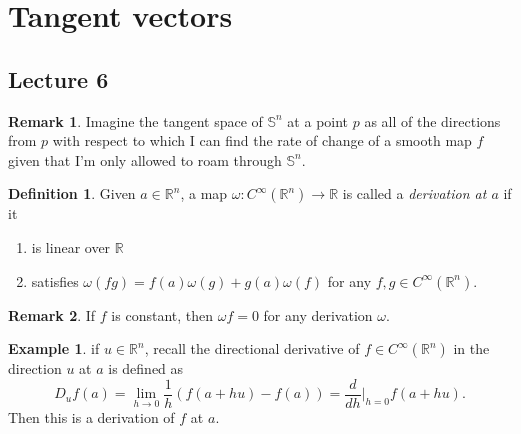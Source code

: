 \documentclass[10pt,letterpaper,cm]{nupset}
\theoremstyle{definition}
\newtheorem*{definition}{Definition}
\newtheorem{exmp}{Example}
\newtheorem{remark}{Remark}
\newcommand{\R}{\mathbb R}
\renewcommand{\S}{\mathbb S}
\newcommand{\1}{\mathbf{1}}
\newcommand{\0}{\vec 0}
\begin{document}
\section{Tangent vectors}

\subsection{Lecture 6}

\begin{remark}
Imagine the tangent space of $\S^n$ at a point $p$ as all of the directions from $p$ with respect to which I can find the rate of change of a smooth map $f$ given that I'm only allowed to roam through $\S^n$. 
\end{remark}


\begin{definition}
Given $a \in \R^n$, a map $\omega: C^{\infty}(\R^n) \to \R$ is called a \textit{derivation at $a$} if it
\begin{enumerate}[label=\alph*.]
\item is linear over $\R$
\item satisfies $\omega(fg) = f(a)\omega(g) + g(a) \omega(f)$ for any $f, g \in C^{\infty}(\R^n)$. 
\end{enumerate}
\end{definition}

\begin{remark}
If $f$ is constant, then $\omega f =0$ for any derivation $\omega$.
\end{remark}

\begin{exmp}
if $u \in \R^n$, recall the directional derivative of $f\in C^{\infty}(\R^n)$ in the direction $u$ at $a$ is defined as $$D_uf(a) = \lim_{h \to 0} \frac{1}{h}(f(a+hu) -f(a)) = \frac{d}{d{h}}\rvert_{h=0} f(a+hu).$$ Then this is a derivation of $f$ at $a$. 
\end{exmp}
\end{document}
